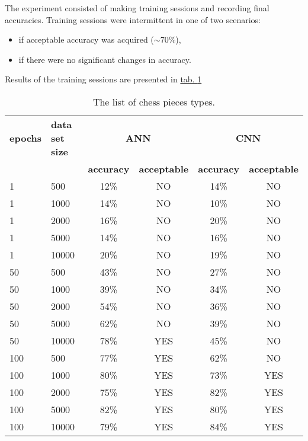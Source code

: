 The experiment consisted of making training sessions and recording final accuracies. Training sessions were intermittent in one of two scenarios:
\begin{itemize}
    \item if acceptable accuracy was acquired ($\sim 70\%$),
    \item if there were no significant changes in accuracy.
\end{itemize}
Results of the training sessions are presented in \hyperref[tab:epochs-dataset-size-testing]{tab. \ref*{tab:epochs-dataset-size-testing}}
\begin{table}
	\centering
	\caption{The list of chess pieces types.}
	\label{tab:epochs-dataset-size-testing}
	\begin{tabular}{ll|cc|cc}
	\toprule
    \textbf{epochs} & \textbf{data set size} & \multicolumn{2}{c}{\textbf{ANN}} & \multicolumn{2}{c}{\textbf{CNN}}\\
		&& \textbf{accuracy} & \textbf{acceptable} & \textbf{accuracy} & \textbf{acceptable}\\
		\hline
			1 & 500 & 12\% & NO & 14\% & NO\\
        \hline
			1 & 1000 & 14\% & NO & 10\% & NO\\
        \hline
			1 & 2000 & 16\% & NO & 20\% & NO\\
        \hline
			1 & 5000 & 14\% & NO & 16\% & NO\\
        \hline
			1 & 10000 & 20\% & NO & 19\% & NO\\
        \toprule[1.5pt]
            50 & 500 & 43\% & NO & 27\% & NO\\
        \hline
			50 & 1000 & 39\% & NO & 34\% & NO\\
        \hline
			50 & 2000 & 54\% & NO & 36\% & NO\\
        \hline
			50 & 5000 & 62\% & NO & 39\% & NO\\
        \hline
			50 & 10000 & 78\% & YES & 45\% & NO\\
        \toprule[1.5pt]
            100 & 500 & 77\% & YES & 62\% & NO\\
        \hline
			100 & 1000 & 80\% & YES & 73\% & YES\\
        \hline
			100 & 2000 & 75\% & YES & 82\% & YES\\
        \hline
			100 & 5000 & 82\% & YES & 80\% & YES\\
        \hline
			100 & 10000 & 79\% & YES & 84\% & YES\\
	\end{tabular}
\end{table}
